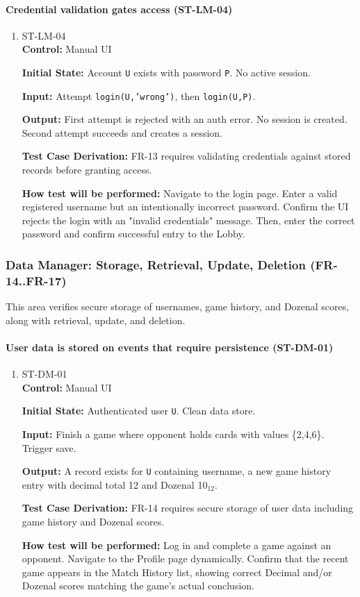 \documentclass[12pt, titlepage]{article}
\begin{document}
\paragraph{Credential validation gates access (ST-LM-04)}
\begin{enumerate}
\item{ST-LM-04\\}
\textbf{Control:} Manual UI

\textbf{Initial State:} Account \texttt{U} exists with password \texttt{P}. No active session.

\textbf{Input:} Attempt \texttt{login(U,'wrong')}, then \texttt{login(U,P)}.

\textbf{Output:} First attempt is rejected with an auth error. No session is created. Second attempt succeeds and creates a session.

\textbf{Test Case Derivation:} FR-13 requires validating credentials against stored records before granting access.

\textbf{How test will be performed:} Navigate to the login page. Enter a valid registered username but an intentionally incorrect password. Confirm the UI rejects the login with an "invalid credentials" message. Then, enter the correct password and confirm successful entry to the Lobby.
\end{enumerate}

\subsubsection{Data Manager: Storage, Retrieval, Update, Deletion (FR-14..FR-17)}

This area verifies secure storage of usernames, game history, and Dozenal scores, along with retrieval, update, and deletion.

\paragraph{User data is stored on events that require persistence (ST-DM-01)}
\begin{enumerate}
\item{ST-DM-01\\}
\textbf{Control:} Manual UI

\textbf{Initial State:} Authenticated user \texttt{U}. Clean data store.

\textbf{Input:} Finish a game where opponent holds cards with values \{2,4,6\}. Trigger save.

\textbf{Output:} A record exists for \texttt{U} containing username, a new game history entry with decimal total 12 and Dozenal 10$_{12}$.

\textbf{Test Case Derivation:} FR-14 requires secure storage of user data including game history and Dozenal scores.

\textbf{How test will be performed:} Log in and complete a game against an opponent. Navigate to the Profile page dynamically. Confirm that the recent game appears in the Match History list, showing correct Decimal and/or Dozenal scores matching the game's actual conclusion.
\end{enumerate}
\end{document}
